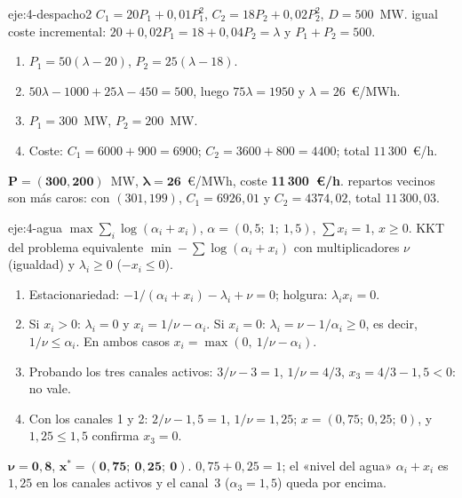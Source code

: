 \begin{solucion}{eje:4-despacho2}
\datos $C_1=20P_1+0{,}01P_1^{2}$, $C_2=18P_2+0{,}02P_2^{2}$, $D=500$~MW.
\planteamiento igual coste incremental: $20+0{,}02P_1=18+0{,}04P_2=\lambda$ y $P_1+P_2=500$.
\pasos
\begin{enumerate}[label=\arabic*.]
  \item $P_1=50(\lambda-20)$, $P_2=25(\lambda-18)$.
  \item $50\lambda-1000+25\lambda-450=500$, luego $75\lambda=1950$ y $\lambda=26$~€/MWh.
  \item $P_1=300$~MW, $P_2=200$~MW.
  \item Coste: $C_1=6000+900=6900$; $C_2=3600+800=4400$; total $11\,300$~€/h.
\end{enumerate}
\resultado $\bm{P=(300,200)}$~MW, $\bm{\lambda=26}$~€/MWh, coste \textbf{11\,300~€/h}.
\comprobacion repartos vecinos son más caros: con $(301,199)$, $C_1=6926{,}01$ y $C_2=4374{,}02$, total $11\,300{,}03$.
\end{solucion}

\begin{solucion}{eje:4-agua}
\datos $\max\sum_i\log(\alpha_i+x_i)$, $\alpha=(0{,}5;\ 1;\ 1{,}5)$, $\sum x_i=1$, $x\ge 0$.
\planteamiento KKT del problema equivalente $\min-\sum\log(\alpha_i+x_i)$ con multiplicadores $\nu$ (igualdad) y $\lambda_i\ge 0$ ($-x_i\le 0$).
\pasos
\begin{enumerate}[label=\arabic*.]
  \item Estacionariedad: $-1/(\alpha_i+x_i)-\lambda_i+\nu=0$; holgura: $\lambda_ix_i=0$.
  \item Si $x_i>0$: $\lambda_i=0$ y $x_i=1/\nu-\alpha_i$. Si $x_i=0$: $\lambda_i=\nu-1/\alpha_i\ge 0$, es decir, $1/\nu\le\alpha_i$. En ambos casos $x_i=\max(0,\ 1/\nu-\alpha_i)$.
  \item Probando los tres canales activos: $3/\nu-3=1$, $1/\nu=4/3$, $x_3=4/3-1{,}5<0$: no vale.
  \item Con los canales 1 y 2: $2/\nu-1{,}5=1$, $1/\nu=1{,}25$; $x=(0{,}75;\ 0{,}25;\ 0)$, y $1{,}25\le 1{,}5$ confirma $x_3=0$.
\end{enumerate}
\resultado $\bm{\nu=0{,}8}$, $\bm{x^{*}=(0{,}75;\ 0{,}25;\ 0)}$.
\comprobacion $0{,}75+0{,}25=1$; el «nivel del agua» $\alpha_i+x_i$ es $1{,}25$ en los canales activos y el canal~3 ($\alpha_3=1{,}5$) queda por encima.
\end{solucion}


